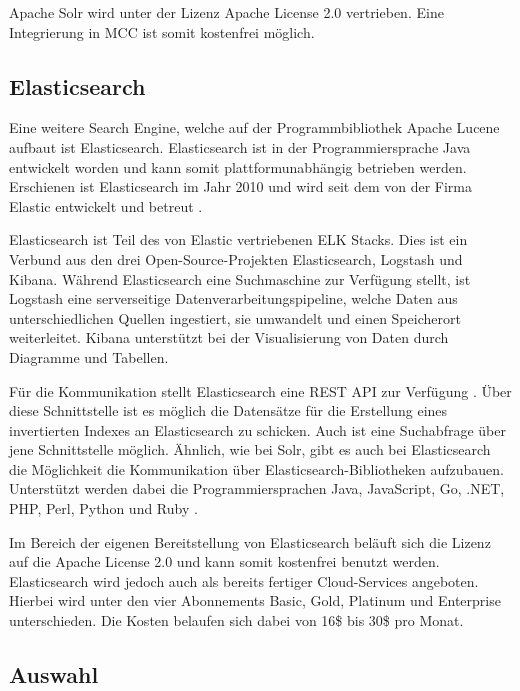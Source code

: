 Apache Solr wird unter der Lizenz \glqq Apache License 2.0\grqq{} vertrieben. Eine Integrierung in MCC ist somit kostenfrei möglich.

\subsection{Elasticsearch\label{subsec4.1.4:Unterunterpunkt-4}}

Eine weitere Search Engine, welche auf der Programmbibliothek \glqq Apache Lucene\grqq{} aufbaut ist Elasticsearch. Elasticsearch ist in der Programmiersprache Java entwickelt worden und kann somit plattformunabhängig betrieben werden. Erschienen ist Elasticsearch im Jahr 2010 und wird seit dem von der Firma Elastic entwickelt und betreut \cite{Elastic.2021}.

Elasticsearch ist Teil des von Elastic vertriebenen \glqq ELK Stacks\grqq{}. Dies ist ein Verbund aus den drei Open-Source-Projekten \glqq Elasticsearch\grqq{}, \glqq Logstash\grqq{} und \glqq Kibana\grqq{}. Während Elasticsearch eine Suchmaschine zur Verfügung stellt, ist Logstash eine serverseitige Datenverarbeitungspipeline, welche Daten aus unterschiedlichen Quellen ingestiert, sie umwandelt und einen Speicherort weiterleitet. Kibana unterstützt bei der Visualisierung von Daten durch Diagramme und Tabellen.

Für die Kommunikation stellt Elasticsearch eine REST API zur Verfügung \cite{Elasticsearch.2021}. Über diese Schnittstelle ist es möglich die Datensätze für die Erstellung eines invertierten Indexes an Elasticsearch zu schicken. Auch ist eine Suchabfrage über jene Schnittstelle möglich. Ähnlich, wie bei Solr, gibt es auch bei Elasticsearch die Möglichkeit die Kommunikation über Elasticsearch-Bibliotheken aufzubauen. Unterstützt werden dabei die Programmiersprachen Java, JavaScript, Go, .NET, PHP, Perl, Python und Ruby \cite{Elasticsearch.2021}.

Im Bereich der eigenen Bereitstellung von Elasticsearch beläuft sich die Lizenz auf die \glqq Apache License 2.0\grqq{} und kann somit kostenfrei benutzt werden. Elasticsearch wird jedoch auch als bereits fertiger Cloud-Services angeboten. Hierbei wird unter den vier Abonnements \glqq Basic\grqq{}, \glqq Gold\grqq{}, \glqq Platinum\grqq{} und \glqq Enterprise\grqq{} unterschieden. Die Kosten belaufen sich dabei von 16\$ bis 30\$ pro Monat.

\subsection{Auswahl\label{subsec4.1.5:Unterunterpunkt-5}}

